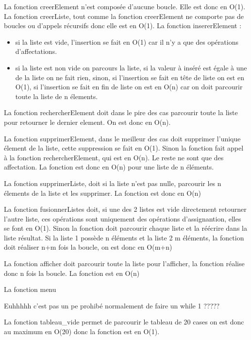 \documentclass[11pt]{report}
\begin{document}
La fonction creerElement n'est composée d'aucune boucle. Elle est donc en O(1).
\medskip
La fonction creerListe, tout comme la fonction creerElement ne comporte pas de boucles ou d'appels récursifs donc elle est en O(1).
\medskip
La fonction insererElement :
\begin{itemize}
	\item si la liste est vide, l'insertion se fait en O(1) car il n'y a que des opérations d'affectations.
	\item si la liste est non vide on parcours la liste, si la valeur à inséré est égale à une de la liste on ne fait rien, sinon, si l'insertion se fait en tête de liste on est en O(1), si l'insertion se fait en fin de liste on est en O(n) car on doit parcourir toute la liste de n élements. 
	
\end{itemize}


\medskip

La fonction rechercherElement doit dans le pire des cas parcourir toute la liste pour retourner le dernier element. On est donc en O(n).

\medskip

La fonction supprimerElement, dans le meilleur des cas doit supprimer l'unique élement de la liste, cette suppression se fait en O(1). Sinon la fonction fait appel à la fonction rechercherElement, qui est en O(n). Le reste ne sont que des affectation. La fonction est donc en O(n) pour une liste de n éléments.

\medskip

La fonction supprimerListe, doit si la liste n'est pas nulle, parcourir les n élements de la liste et les supprimer. La fonction est donc en O(n) 

\medskip

La fonction fusionnerListes doit, si une des 2 listes est vide directement retourner l'autre liste, ces opérations sont uniquement des opérations d'assignantion, elles se font en O(1). Sinon la fonction doit parcourir chaque liste et la réécrire dans la liste résultat. Si la liste 1 possède n éléments et la liste 2 m éléments, la fonction doit réaliser n+m fois la boucle, on est donc en O(m+n)

\medskip

La fonction afficher doit parcourir toute la liste pour l'afficher, la fonction réalise donc n fois la boucle. La fonction est en O(n)

\medskip

La fonction menu  

Euhhhhh c'est pas un pe prohibé normalement de faire un while 1 ?????

\medskip

La fonction tableau\_vide permet de parcourir le tableau de 20 cases on est donc au maximum en O(20) donc la fonction est en O(1).
\end{document}
